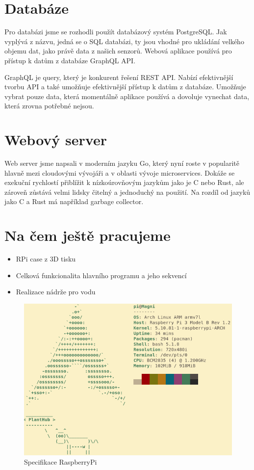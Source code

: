 \documentclass[11pt,a4paper]{article}
\begin{document}
\clearpage

\section{Databáze}

Pro databázi jsme se rozhodli použít databázový systém PostgreSQL. Jak vyplývá
z názvu, jedná se o SQL databázi, ty jsou vhodné pro ukládání velkého objemu
dat, jako právě data z našich senzorů. Webová aplikace používá pro přístup k
datům z databáze GraphQL API.

GraphQL je query, který je konkurent řešení REST API. Nabízí efektivnější
tvorbu API a také umožňuje efektivnější přístup k datům z databáze. Umožňuje
vybrat pouze data, která momentálně aplikace používá a dovoluje vynechat data,
která zrovna potřebné nejsou.

\clearpage

\section{Webový server}

Web server jsme napsali v moderním jazyku Go, který nyní roste v popularitě
hlavně mezi cloudovými vývojáři a v oblasti vývoje microservices. Dokáže se
exekuční rychlostí přiblížit k nízkoúrovňovým jazykům jako je C nebo Rust, ale
zároveň zůstává velmi lidsky čitelný a jednoduchý na použití. Na rozdíl od
jazyků jako C a Rust má například garbage collector.

\clearpage

\section{Na čem ještě pracujeme}

\begin{itemize}
	\item RPi case z 3D tisku
	\item Celková funkcionalita hlavního programu a jeho sekvencí
	\item Realizace nádrže pro vodu
\end{itemize}

\begin{figure}[h]
	\centering
	\includegraphics[width=0.7\linewidth]{specs.png}
	\caption{Specifikace RaspberryPi}
\end{figure}
\end{document}
